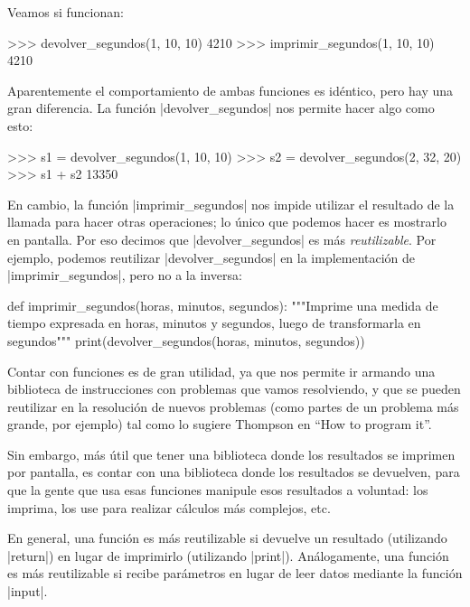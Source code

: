 Veamos si funcionan:

\begin{codigo-python-sn}
>>> devolver_segundos(1, 10, 10)
4210
>>> imprimir_segundos(1, 10, 10)
4210
\end{codigo-python-sn}

Aparentemente el comportamiento de ambas funciones es idéntico, pero hay una
gran diferencia. La función |devolver_segundos| nos permite hacer algo como
esto:

\begin{codigo-python-sn}
>>> s1 = devolver_segundos(1, 10, 10)
>>> s2 = devolver_segundos(2, 32, 20)
>>> s1 + s2
13350
\end{codigo-python-sn}

En cambio, la función |imprimir_segundos| nos impide utilizar el resultado de
la llamada para hacer otras operaciones; lo único que podemos hacer es
mostrarlo en pantalla. Por eso decimos que |devolver_segundos| es más
\emph{reutilizable}. Por ejemplo, podemos reutilizar |devolver_segundos| en la
implementación de |imprimir_segundos|, pero no a la inversa:

\begin{codigo-python-sn}
def imprimir_segundos(horas, minutos, segundos):
    """Imprime una medida de tiempo expresada en horas, minutos y
       segundos, luego de transformarla en segundos"""
    print(devolver_segundos(horas, minutos, segundos))
\end{codigo-python-sn}

Contar con funciones es de gran utilidad, ya que nos permite ir armando una
biblioteca de instrucciones con problemas que vamos resolviendo, y que se
pueden reutilizar en la resolución de nuevos problemas (como partes de un
problema más grande, por ejemplo) tal como lo sugiere Thompson en ``How to
program it''.

Sin embargo, más útil que tener una biblioteca donde los resultados
se imprimen por pantalla, es contar con una biblioteca donde los
resultados se devuelven, para que la gente que usa esas funciones manipule
esos resultados a voluntad: los imprima, los use para realizar cálculos
más complejos, etc.

\begin{observacion}
En general, una función es más reutilizable si devuelve un resultado
(utilizando |return|) en lugar de imprimirlo (utilizando |print|).
Análogamente, una función es más reutilizable si recibe parámetros en lugar
de leer datos mediante la función |input|.
\end{observacion}

